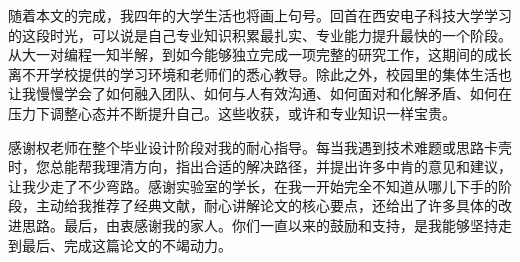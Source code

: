 随着本文的完成，我四年的大学生活也将画上句号。回首在西安电子科技大学学习的这段时光，可以说是自己专业知识积累最扎实、专业能力提升最快的一个阶段。从大一对编程一知半解，到如今能够独立完成一项完整的研究工作，这期间的成长离不开学校提供的学习环境和老师们的悉心教导。除此之外，校园里的集体生活也让我慢慢学会了如何融入团队、如何与人有效沟通、如何面对和化解矛盾、如何在压力下调整心态并不断提升自己。这些收获，或许和专业知识一样宝贵。

感谢权老师在整个毕业设计阶段对我的耐心指导。每当我遇到技术难题或思路卡壳时，您总能帮我理清方向，指出合适的解决路径，并提出许多中肯的意见和建议，让我少走了不少弯路。感谢实验室的学长，在我一开始完全不知道从哪儿下手的阶段，主动给我推荐了经典文献，耐心讲解论文的核心要点，还给出了许多具体的改进思路。最后，由衷感谢我的家人。你们一直以来的鼓励和支持，是我能够坚持走到最后、完成这篇论文的不竭动力。